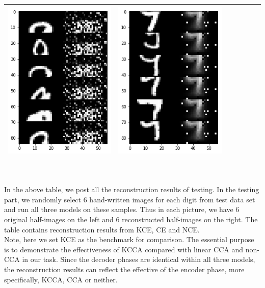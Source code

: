 \documentclass[12pt]{report} %
\begin{document}
\begin{tabular}{m{0.7cm}m{2.4cm}m{2.4cm}m{2.4cm}m{2.4cm}m{2.4cm}m{2.4cm}}
\includegraphics[scale=0.3]{pictures/M2_9_up.png} & \includegraphics[scale=0.3]{pictures/M2_9_down.png}\\
\bottomrule
\end{tabular}
\\
\\
In the above table, we post all the reconstruction results of testing. In the testing part, we randomly select 6 hand-written images for each digit from test data set and run all three models on these samples. Thus in each picture, we have 6 original half-images on the left and 6 reconstructed half-images on the right. The table contains reconstruction results from KCE, CE and NCE. \\
Note, here we set KCE as the benchmark for comparison. The essential purpose is to demonstrate the effectiveness of KCCA compared with linear CCA and non-CCA in our task. Since the decoder phases are identical within all three models, the reconstruction results can reflect the effective of the encoder phase, more specifically, KCCA, CCA or neither. \\
\end{document}
